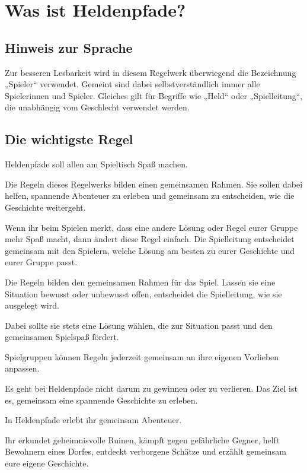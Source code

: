 \chapter{Was ist Heldenpfade?}
\label{chap:introduction}

\section*{Hinweis zur Sprache}

Zur besseren Lesbarkeit wird in diesem Regelwerk überwiegend die Bezeichnung „Spieler“ verwendet. Gemeint sind dabei selbstverständlich immer alle Spielerinnen und Spieler. Gleiches gilt für Begriffe wie „Held“ oder „Spielleitung“, die unabhängig vom Geschlecht verwendet werden.

\section*{Die wichtigste Regel}

Heldenpfade soll allen am Spieltisch Spaß machen.

Die Regeln dieses Regelwerks bilden einen gemeinsamen Rahmen. Sie sollen dabei helfen, spannende Abenteuer zu erleben und gemeinsam zu entscheiden, wie die Geschichte weitergeht.

Wenn ihr beim Spielen merkt, dass eine andere Lösung oder Regel eurer Gruppe mehr Spaß macht, dann ändert diese Regel einfach. Die Spielleitung entscheidet gemeinsam mit den Spielern, welche Lösung am besten zu eurer Geschichte und eurer Gruppe passt.

\begin{kurzregel}[title={Grundsatz: Die Spielleitung entscheidet}]
Die Regeln bilden den gemeinsamen Rahmen für das Spiel. Lassen sie eine Situation bewusst oder unbewusst offen, entscheidet die Spielleitung, wie sie ausgelegt wird.

Dabei sollte sie stets eine Lösung wählen, die zur Situation passt und den gemeinsamen Spielspaß fördert.

Spielgruppen können Regeln jederzeit gemeinsam an ihre eigenen Vorlieben anpassen.
\end{kurzregel}

Es geht bei Heldenpfade nicht darum zu gewinnen oder zu verlieren. Das Ziel ist es, gemeinsam eine spannende Geschichte zu erleben.

In Heldenpfade erlebt ihr gemeinsam Abenteuer.

Ihr erkundet geheimnisvolle Ruinen, kämpft gegen gefährliche Gegner, helft Bewohnern eines Dorfes, entdeckt verborgene Schätze und erzählt gemeinsam eure eigene Geschichte.

